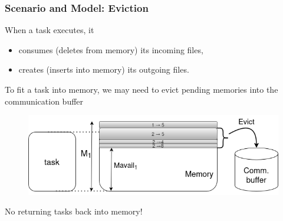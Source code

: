 \documentclass[xcolor=svgnames,titlepage,english,presentation]{beamer}
\begin{document}
\begin{frame}[t]
    \frametitle{Scenario and Model: Eviction}
   

      When a task executes, it
        
         \begin{itemize}
             \item consumes (deletes from memory) its incoming files,
             \item creates (inserts into memory) its outgoing files.

             \end{itemize}              
   
  To fit a task into memory, we may need to evict pending memories into the communication buffer
      

          \begin{figure}
            \centering
            \includegraphics[scale=0.4]{diagrams/images/evictionCCGRID.png}    
        \end{figure}
       
No returning tasks back into memory!


\end{frame}
\end{document}

